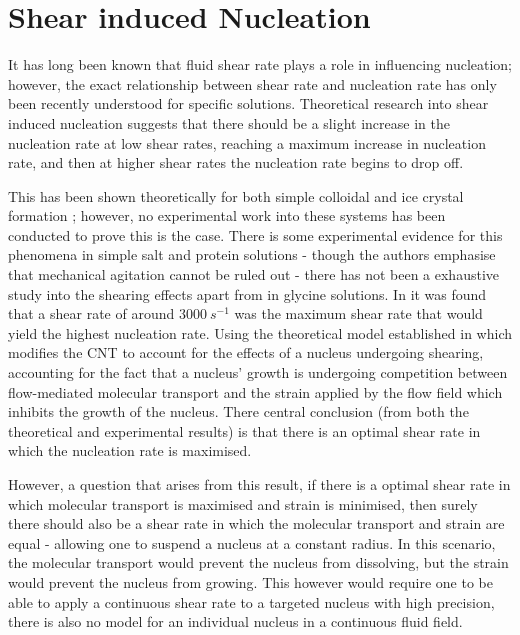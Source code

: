 \section{Shear induced Nucleation}
It has long been known that fluid shear rate plays a role in influencing
nucleation; however, the exact relationship between shear rate and nucleation
rate has only been recently understood for specific solutions. Theoretical 
research into shear induced nucleation suggests that there should be a 
slight increase in the nucleation rate at low shear rates, reaching a 
maximum increase in nucleation rate, and then at higher shear rates the 
nucleation rate begins to drop off. 

This has been shown theoretically for both simple colloidal \cite{Mura2016,
Debuysschere2023,Richard2015} and ice crystal formation \cite{Goswami2020}; 
however, no experimental work into these systems has been conducted to prove 
this is the case. There is some experimental evidence for this phenomena in 
simple salt and protein solutions - though the authors emphasise that 
mechanical agitation cannot be ruled out - there has not been a exhaustive 
study into the shearing effects apart from in glycine solutions. In 
\cite{Debuysschere2023} it was found that a shear rate of around $3000\ 
s^{-1}$ was the maximum shear rate that would yield the highest nucleation rate. 
Using the theoretical model established in \cite{Mura2016,2001} which modifies 
the CNT to account for the effects of a nucleus undergoing shearing, 
accounting for the fact that a nucleus' growth is undergoing competition 
between flow-mediated molecular transport and the strain applied by the 
flow field which inhibits the growth of the nucleus. There central 
conclusion (from both the theoretical and experimental results) is that 
there is an optimal shear rate in which the nucleation rate is maximised. 

However, a question that arises from this result, if there is a optimal 
shear rate in which molecular transport is maximised and strain is 
minimised, then surely there should also be a shear rate in which the 
molecular transport and strain are equal - allowing one to suspend a 
nucleus at a constant radius. In this scenario, the molecular transport 
would prevent the nucleus from dissolving, but the strain would prevent 
the nucleus from growing. This however would require one to be able 
to apply a continuous shear rate to a targeted nucleus with high precision, 
there is also no model for an individual nucleus in a continuous fluid 
field. 



